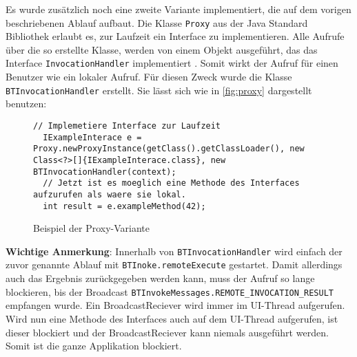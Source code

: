 Es wurde zusätzlich noch eine zweite Variante implementiert, die auf dem vorigen beschriebenen Ablauf aufbaut. Die Klasse \lstinline{Proxy} aus der Java Standard Bibliothek erlaubt es, zur Laufzeit ein Interface zu implementieren. Alle Aufrufe über die so erstellte Klasse, werden von einem Objekt ausgeführt, das das Interface \lstinline{InvocationHandler} implementiert \cite{dpunkt2002}. Somit wirkt der Aufruf für einen Benutzer wie ein lokaler Aufruf. Für diesen Zweck wurde die Klasse \lstinline{BTInvocationHandler} erstellt. Sie lässt sich wie in \autoref{fig:proxy} dargestellt benutzen:
\begin{figure}[hbtp]
  \begin{lstlisting}[basicstyle=\ttfamily\scriptsize]
  // Implemetiere Interface zur Laufzeit
  IExampleInterace e = Proxy.newProxyInstance(getClass().getClassLoader(), new Class<?>[]{IExampleInterace.class}, new BTInvocationHandler(context);
  // Jetzt ist es moeglich eine Methode des Interfaces aufzurufen als waere sie lokal.
  int result = e.exampleMethod(42);
  \end{lstlisting}
  \caption{Beispiel der Proxy-Variante}
  \label{fig:proxy}
\end{figure}
\begin{sloppypar}
\textbf{Wichtige Anmerkung}: Innerhalb von \lstinline{BTInvocationHandler} wird einfach der zuvor genannte Ablauf mit \lstinline{BTInoke.remoteExecute} gestartet. Damit allerdings auch das Ergebnis zurückgegeben werden kann, muss der Aufruf so lange blockieren, bis der Broadcast \lstinline{BTInvokeMessages.REMOTE_INVOCATION_RESULT} empfangen wurde. Ein BroadcastReciever wird immer im UI-Thread aufgerufen. Wird nun eine Methode des Interfaces auch auf dem UI-Thread aufgerufen, ist dieser blockiert und der BroadcastReciever kann niemals ausgeführt werden. Somit ist die ganze Applikation blockiert.
\end{sloppypar}
